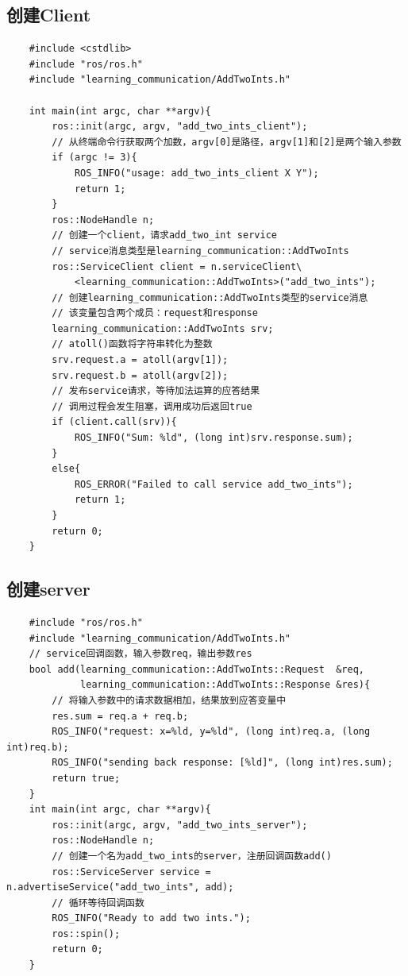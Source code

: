 \documentclass[10pt, oneside]{book}
\begin{document}
\subsection{创建Client}

\begin{verbatim}
    #include <cstdlib>
    #include "ros/ros.h"
    #include "learning_communication/AddTwoInts.h"
    
    int main(int argc, char **argv){
        ros::init(argc, argv, "add_two_ints_client");
        // 从终端命令行获取两个加数，argv[0]是路径，argv[1]和[2]是两个输入参数
        if (argc != 3){
            ROS_INFO("usage: add_two_ints_client X Y");
            return 1;
        }
        ros::NodeHandle n;    
        // 创建一个client，请求add_two_int service
        // service消息类型是learning_communication::AddTwoInts
        ros::ServiceClient client = n.serviceClient\
            <learning_communication::AddTwoInts>("add_two_ints");
        // 创建learning_communication::AddTwoInts类型的service消息
        // 该变量包含两个成员：request和response
        learning_communication::AddTwoInts srv;
        // atoll()函数将字符串转化为整数
        srv.request.a = atoll(argv[1]);
        srv.request.b = atoll(argv[2]);
        // 发布service请求，等待加法运算的应答结果
        // 调用过程会发生阻塞，调用成功后返回true
        if (client.call(srv)){
            ROS_INFO("Sum: %ld", (long int)srv.response.sum);
        }
        else{
            ROS_ERROR("Failed to call service add_two_ints");
            return 1;
        }
        return 0;
    }
\end{verbatim}

\subsection{创建server}

\begin{verbatim}
    #include "ros/ros.h"
    #include "learning_communication/AddTwoInts.h"
    // service回调函数，输入参数req，输出参数res
    bool add(learning_communication::AddTwoInts::Request  &req,
             learning_communication::AddTwoInts::Response &res){
        // 将输入参数中的请求数据相加，结果放到应答变量中
        res.sum = req.a + req.b;
        ROS_INFO("request: x=%ld, y=%ld", (long int)req.a, (long int)req.b);
        ROS_INFO("sending back response: [%ld]", (long int)res.sum);
        return true;
    }
    int main(int argc, char **argv){
        ros::init(argc, argv, "add_two_ints_server");
        ros::NodeHandle n;
        // 创建一个名为add_two_ints的server，注册回调函数add()
        ros::ServiceServer service = n.advertiseService("add_two_ints", add);
        // 循环等待回调函数
        ROS_INFO("Ready to add two ints.");
        ros::spin();
        return 0;
    }    
\end{verbatim}
\end{document}
